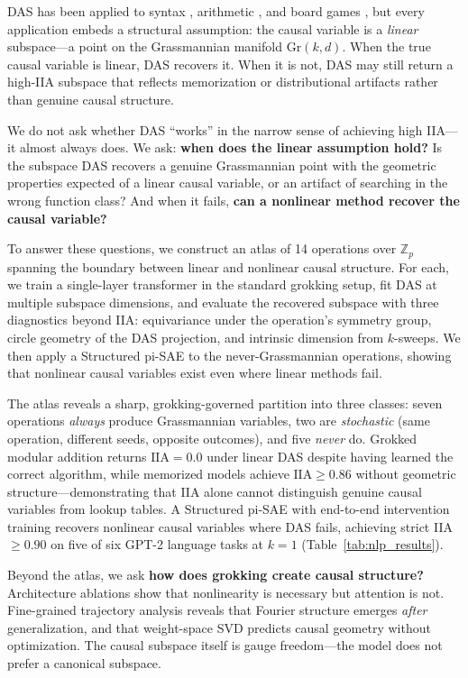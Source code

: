 \documentclass{article}
\newcommand{\Gr}{\mathrm{Gr}}
\newcommand{\IIA}{\mathrm{IIA}}
\newcommand{\Z}{\mathbb{Z}}
\begin{document}
DAS has been applied to syntax \citep{geiger2023finding}, arithmetic
\citep{wu2024interpretability}, and board games \citep{li2023emergent}, but
every application embeds a structural assumption: the causal variable is a
\emph{linear} subspace---a point on the Grassmannian manifold $\Gr(k,d)$. When
the true causal variable is linear, DAS recovers it. When it is not, DAS may
still return a high-IIA subspace that reflects memorization or distributional
artifacts rather than genuine causal structure.

We do not ask whether DAS ``works'' in the narrow sense of achieving high IIA---it
almost always does. We ask: \textbf{when does the linear assumption hold?} Is the
subspace DAS recovers a genuine Grassmannian point with the geometric properties
expected of a linear causal variable, or an artifact of searching in the wrong
function class? And when it fails, \textbf{can a nonlinear method recover the
causal variable?}

To answer these questions, we construct an atlas of 14 operations over $\Z_p$
spanning the boundary between linear and nonlinear causal structure. For each, we
train a single-layer transformer in the standard grokking setup, fit DAS at
multiple subspace dimensions, and evaluate the recovered subspace with three
diagnostics beyond IIA: equivariance under the operation's symmetry group, circle
geometry of the DAS projection, and intrinsic dimension from $k$-sweeps. We then
apply a Structured pi-SAE \citep{narayanaswamy2017learning} to the
never-Grassmannian operations, showing that nonlinear causal variables exist even
where linear methods fail.

The atlas reveals a sharp, grokking-governed partition into three classes:
seven operations \emph{always} produce Grassmannian variables, two are
\emph{stochastic} (same operation, different seeds, opposite outcomes), and
five \emph{never} do. Grokked modular addition returns $\IIA = 0.0$ under
linear DAS despite having learned the correct algorithm, while memorized
models achieve $\IIA \geq 0.86$ without geometric structure---demonstrating
that IIA alone cannot distinguish genuine causal variables from lookup tables.
A Structured pi-SAE with end-to-end intervention training recovers nonlinear
causal variables where DAS fails, achieving strict IIA~$\geq 0.90$ on five of
six GPT-2 language tasks at $k{=}1$ (Table~\ref{tab:nlp_results}).

Beyond the atlas, we ask \textbf{how does grokking create causal structure?}
Architecture ablations show that nonlinearity is necessary but attention is
not. Fine-grained trajectory analysis reveals that Fourier structure emerges
\emph{after} generalization, and that weight-space SVD predicts causal
geometry without optimization. The causal subspace itself is gauge
freedom---the model does not prefer a canonical subspace.
\end{document}
